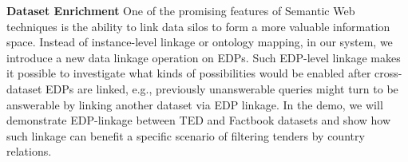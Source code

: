 \noindent \textbf{Dataset Enrichment}
One of the promising features of Semantic Web techniques is the ability to link data silos to form a more valuable information space. Instead of instance-level linkage or ontology mapping, in our system, we introduce a new data linkage operation on EDPs. Such EDP-level linkage makes it possible to investigate what kinds of possibilities would be enabled after cross-dataset EDPs are linked, e.g., previously unanswerable queries might turn to be answerable by linking another dataset via EDP linkage. In the demo, we will demonstrate EDP-linkage between TED and Factbook datasets and show how such linkage can benefit a specific scenario of filtering tenders by country relations.
